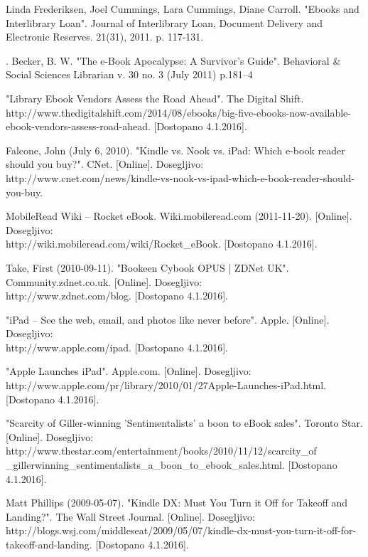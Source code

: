 \documentclass[a4paper, 12pt]{book}
\begin{document}
\begin{thebibliography}{99}
 Linda Frederiksen, Joel Cummings, Lara Cummings, Diane Carroll. "Ebooks and Interlibrary Loan".  Journal of Interlibrary Loan, Document Delivery and Electronic Reserves. 21(31), 2011. p. 117-131. 

. Becker, B. W. "The e-Book Apocalypse: A Survivor's Guide". Behavioral \& Social Sciences Librarian v. 30 no. 3 (July 2011) p.181–4 

 "Library Ebook Vendors Assess the Road Ahead". The Digital Shift. 
http://www.thedigitalshift.com/2014/08/ebooks/big-five-ebooks-now-available-ebook-vendors-assess-road-ahead.
[Dostopano 4.1.2016].

 Falcone, John (July 6, 2010). "Kindle vs. Nook vs. iPad: Which e-book reader should you buy?". CNet.
[Online]. Dosegljivo:\\http://www.cnet.com/news/kindle-vs-nook-vs-ipad-which-e-book-reader-should-you-buy.

 MobileRead Wiki – Rocket eBook. Wiki.mobileread.com (2011-11-20). 
[Online]. Dosegljivo:\\ http://wiki.mobileread.com/wiki/Rocket\_eBook.
[Dostopano 4.1.2016].

 Take, First (2010-09-11). "Bookeen Cybook OPUS | ZDNet UK". Community.zdnet.co.uk. [Online]. Dosegljivo:\\ http://www.zdnet.com/blog.
[Dostopano 4.1.2016].

 "iPad – See the web, email, and photos like never before". Apple. 
[Online]. Dosegljivo:\\ http://www.apple.com/ipad.
[Dostopano 4.1.2016].


 "Apple Launches iPad". Apple.com.
[Online]. Dosegljivo:\\ http://www.apple.com/pr/library/2010/01/27Apple-Launches-iPad.html.
[Dostopano 4.1.2016].


 "Scarcity of Giller-winning 'Sentimentalists' a boon to eBook sales". Toronto Star.
[Online]. Dosegljivo:\\ http://www.thestar.com/entertainment/books/2010/11/12/scarcity\_of
\_gillerwinning\_sentimentalists\_a\_boon\_to\_ebook\_sales.html.
[Dostopano 4.1.2016].


 Matt Phillips (2009-05-07). "Kindle DX: Must You Turn it Off for Takeoff and Landing?". The Wall Street Journal. 
[Online]. Dosegljivo:\\ http://blogs.wsj.com/middleseat/2009/05/07/kindle-dx-must-you-turn-it-off-for-takeoff-and-landing.
[Dostopano 4.1.2016].




\end{thebibliography}
\end{document}

